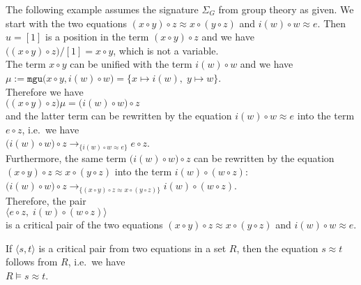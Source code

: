 \example
The following example assumes the signature $\Sigma_G$ from group theory as given.
We start with the two equations $(x \circ y) \circ z \approx x \circ (y \circ z)$ and $i(w) \circ w \approx e$.
Then $u = [1]$ is a position in the term $(x \circ y) \circ z$ and we have
\\[0.2cm]
\hspace*{1.3cm}
$\bigl((x \circ y) \circ z\bigr)/[1] = x \circ y$, which is not a variable.
\\[0.2cm]
The term $x \circ y$ can be unified with the term $i(w) \circ w$ and we have
\\[0.2cm]
\hspace*{1.3cm}
$\mu := \texttt{mgu}\bigl(x \circ y, i(w) \circ w\bigr) = \{ x \mapsto i(w),\; y \mapsto w \}$.
\\[0.2cm]
Therefore we have
\\[0.2cm]
\hspace*{1.3cm}
$\bigl((x \circ y) \circ z\bigr)\mu = \bigl(i(w) \circ w\bigr) \circ z$
\\[0.2cm]
and the latter term can be rewritten by the equation $i(w) \circ w \approx e$ into the term $e \circ z$,
i.e.~we have
\\[0.2cm]
\hspace*{1.3cm}
$\bigl(i(w) \circ w\bigr) \circ z \rightarrow_{\{ i(w) \circ w \approx e\}} e \circ z$.
\\[0.2cm]
Furthermore, the same term $\bigl(i(w) \circ w\bigr) \circ z$ can be rewritten by the equation
$(x \circ y) \circ z \approx x \circ (y \circ z)$ into the term $i(w) \circ (w \circ z)$:  
\\[0.2cm]
\hspace*{1.3cm}
$\bigl(i(w) \circ w\bigr) \circ z \rightarrow_{\{ (x \circ y) \circ z \approx x \circ (y \circ z)\}} i(w) \circ (w \circ z)$.
\\[0.2cm]
Therefore, the pair
\\[0.2cm]
\hspace*{1.3cm}
$\bigl\langle e \circ z,\; i(w) \circ (w \circ z) \bigr\rangle$
\\[0.2cm]
is a critical pair of the two equations  $(x \circ y) \circ z \approx x \circ (y \circ z)$ and $i(w) \circ w \approx e$.
\eox

\remark
If $\langle s, t\rangle$ is a critical pair from two equations in a set $R$, then the equation $s \approx t$
follows from $R$, i.e.~we have
\\[0.2cm]
\hspace*{1.3cm}
$R \models s \approx t$. \eox


